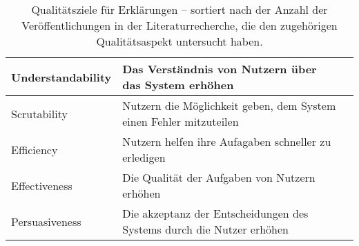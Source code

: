 \begin{table}[htb!]
\begin{center}
\begin{tabular}{|p{}|p{}|p{}|}
            Understandability           & Das Verständnis von Nutzern über das System erhöhen \cite[vgl.][]{chazette_end-users_nodate}
                                        & \cite{chazette_knowledge_nodate} \cite{chazette_end-users_nodate} \cite{martin_evaluating_2021}  \cite{ehsan_human-centered_2020} \cite{rjoob_towards_2021}  \cite{sokol_one_2020} \cite{cheng2019explaining} \\ \hline
            Scrutability                & Nutzern die Möglichkeit geben, dem System einen Fehler mitzuteilen \cite[vgl.][]{balog_measuring_2020}
                                        & \cite{nunes_systematic_2017} \cite{chazette_knowledge_nodate} \cite{tintarev_designing_nodate} \cite{balog_measuring_2020} \cite{tintarev2015explaining} \cite{martin_developing_2019} \cite{gunning2019darpa}  \cite{tintarev2007survey} \cite{martin_evaluating_2021} \\ \hline
            Efficiency                  & Nutzern helfen ihre Aufagaben schneller zu erledigen \cite[vgl.][]{balog_measuring_2020} 
                                        & \cite{nunes_systematic_2017} \cite{chazette_knowledge_nodate} \cite{tintarev_designing_nodate} \cite{balog_measuring_2020} \cite{tsai_evaluating_2019} \cite{tintarev2015explaining} \cite{hernandez-bocanegra_effects_2020} \cite{tintarev2007survey}\\ \hline
            Effectiveness               & Die Qualität der Aufgaben von Nutzern erhöhen \cite[vgl.][]{balog_measuring_2020}
                                        & \cite{nunes_systematic_2017} \cite{chazette_knowledge_nodate} \cite{tintarev_designing_nodate} \cite{balog_measuring_2020} \cite{tintarev2015explaining} \cite{zolotas_towards_2019} \cite{hernandez-bocanegra_effects_2020} \cite{martin_evaluating_2021} \cite{rjoob_towards_2021} \cite{tintarev2007survey} \\ \hline
            Persuasiveness              & Die akzeptanz der Entscheidungen des Systems durch die Nutzer erhöhen \cite[vgl.][]{chazette_knowledge_nodate}
                                        & \cite{nunes_systematic_2017} \cite{tintarev_designing_nodate} \cite{balog_measuring_2020} \cite{sato_context_nodate} \cite{sato_context_nodate} \cite{abdulrahman_belief-based_2019} \cite{tintarev2015explaining} \cite{sato_action-triggering_2019} \cite{tintarev2007survey} \\ \hline
        \end{tabular}
    \end{center}
    \caption{Qualitätsziele für Erklärungen – sortiert nach der Anzahl der Veröffentlichungen in der Literaturrecherche, die den zugehörigen Qualitätsaspekt untersucht haben.}
    \label{tab:quality_aspects_of_explanation}
\end{table}

